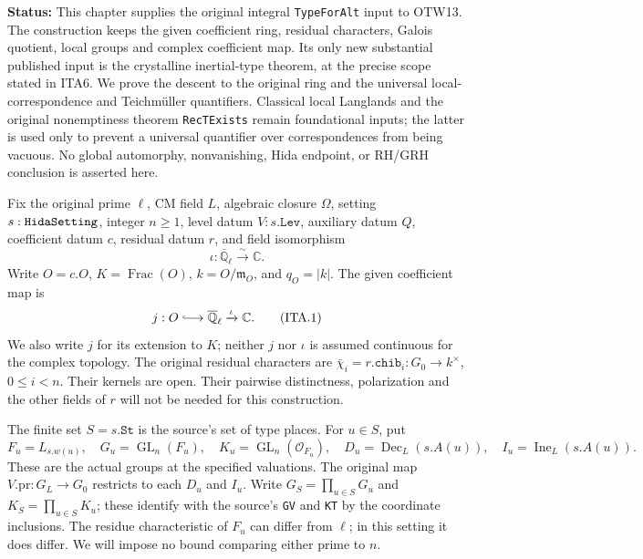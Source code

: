 \documentclass[11pt,a4paper]{article}
\numberwithin{equation}{section}
\theoremstyle{remark}\newtheorem{remark}[theorem]{Remark}
\newcommand{\status}[1]{\textbf{Status:} #1}
\begin{document}
\status{This chapter supplies the original integral
\texttt{Type\allowbreak For\allowbreak Alt} input to OTW13.  The construction keeps the
given coefficient ring, residual characters, Galois quotient,
local groups and complex coefficient map.  Its only new substantial
published input is the crystalline inertial-type theorem, at the
precise scope stated in ITA6.  We prove the descent to the original
ring and the universal local-correspondence and Teichm\"uller
quantifiers.  Classical local Langlands and the original
nonemptiness theorem \texttt{Rec\allowbreak TExists} remain foundational inputs;
the latter is used only to prevent a universal quantifier over
correspondences from being vacuous.  No global automorphy,
nonvanishing, Hida endpoint, or RH/GRH conclusion is asserted here.}

Fix the original prime $\ell$, CM field $L$, algebraic closure
$\Omega$, setting $s:\texttt{Hida\allowbreak Setting}$, integer $n\geq1$,
level datum $V:s.\texttt{Lev}$, auxiliary datum $Q$, coefficient
datum $c$, residual datum $r$, and field isomorphism
\[
 \iota:\overline{\mathbb Q}_\ell\xrightarrow{\sim}\mathbb C.
\]
Write $O=c.O$, $K=\operatorname{Frac}(O)$,
$k=O/\mathfrak m_O$, and $q_O=|k|$.  The given coefficient
map is
\[
 j:O\lhook\joinrel\longrightarrow\overline{\mathbb Q}_\ell
              \xrightarrow{\iota}\mathbb C.
 \tag{ITA.1}
\]
We also write $j$ for its extension to $K$; neither $j$ nor
$\iota$ is assumed continuous for the complex topology.
The original residual characters are
$\bar\chi_i=r.\texttt{chib}_i:G_0\to k^\times$,
$0\leq i<n$.  Their kernels are open.  Their pairwise
distinctness, polarization and the other fields of $r$ will not
be needed for this construction.

The finite set $S=s.\texttt{St}$ is the source's set of type
places.  For $u\in S$, put
\[
 F_u=L_{s.w(u)},\quad G_u=\operatorname{GL}_n(F_u),\quad
 K_u=\operatorname{GL}_n(\mathcal O_{F_u}),\quad
 D_u=\operatorname{Dec}_L(s.A(u)),\quad
 I_u=\operatorname{Ine}_L(s.A(u)).
 \tag{ITA.2}
\]
These are the actual groups at the specified valuations.
The original map $V.\mathrm{pr}:G_L\to G_0$ restricts to
each $D_u$ and $I_u$.  Write
$G_S=\prod_{u\in S}G_u$ and $K_S=\prod_{u\in S}K_u$;
these identify with the source's \texttt{GV} and \texttt{KT}
by the coordinate inclusions.  The residue characteristic of
$F_u$ can differ from $\ell$; in this setting it does differ.
We will impose no bound comparing either prime to $n$.
\end{document}
